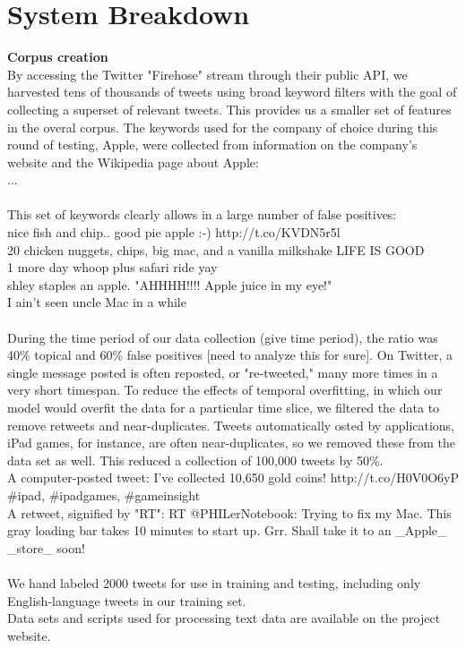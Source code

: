 \documentclass[letterpaper]{article}
\begin{document}
\section{System Breakdown}
\textbf{Corpus creation}\\
By accessing the Twitter "Firehose" stream through their public API, we harvested tens of thousands of tweets using broad keyword filters with the goal of collecting a superset of relevant tweets. This provides us a smaller set of features in the overal corpus. The keywords used for the company of choice during this round of testing, Apple, were collected from information on the company's website and the Wikipedia page about Apple:\\
...\\
\\
This set of keywords clearly allows in a large number of false positives:\\
nice fish and chip.. good pie apple :-) http://t.co/KVDN5r5l \\
20 chicken nuggets, chips, big mac, and a vanilla milkshake LIFE IS GOOD \\
1 more day whoop plus safari ride yay \\
shley staples an apple.  "AHHHH!!!!  Apple juice in my eye!" \\
I ain't seen uncle Mac in a while\\
\\
During the time period of our data collection (give time period), the ratio was 40\% topical and 60\% false positives [need to analyze this for sure].
On Twitter, a single message posted is often reposted, or "re-tweeted," many more times in a very short timespan. To reduce the effects of temporal overfitting, in which our model would overfit the data for a particular time slice, we filtered the data to remove retweets and near-duplicates. Tweets automatically osted by applications, iPad games, for instance, are often near-duplicates, so we removed these from the data set as well. This reduced a collection of 100,000 tweets by 50\%. \\
A computer-posted tweet: I've collected 10,650 gold coins! http://t.co/H0V0O6yP #ipad, #ipadgames, #gameinsight\\
A retweet, signified by "RT": RT @PHILerNotebook: Trying to fix my Mac. This gray loading bar takes 10 minutes to start up. Grr. Shall take it to an _Apple_ _store_ soon! \\
\\
We hand labeled 2000 tweets for use in training and testing, including only English-language tweets in our training set. \\
Data sets and scripts used for processing text data are available on the project website.
\end{document}
